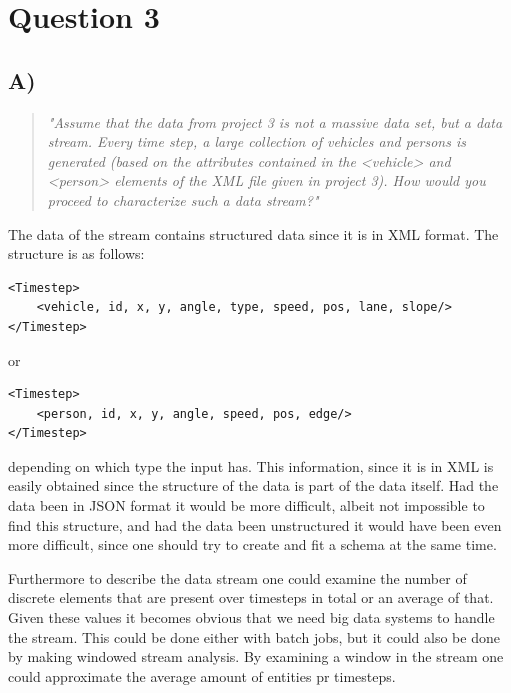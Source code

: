 \section{Question 3}

\subsection{A)}
\begin{quote}
	\textit{"Assume	that	the	data	from	project	3	is	not	a	massive	data	set,	but	a	data	stream.	Every	time	step,	a	large	collection	of	vehicles	and	persons	is	generated	(based	on	the	attributes	contained	in	the	<vehicle>	and	<person>	elements	of	the	XML	file	given	in	project	3).	How	would	you	proceed	to	characterize	such	a	data	stream?"}
\end{quote}
The data of the stream contains structured data since it is in XML format. The structure is as follows:
\begin{verbatim}
<Timestep>
    <vehicle, id, x, y, angle, type, speed, pos, lane, slope/>
</Timestep>
\end{verbatim}
or 
\begin{verbatim}
<Timestep>
    <person, id, x, y, angle, speed, pos, edge/>
</Timestep>
\end{verbatim}
depending on which type the input has. This information, since it is in XML is easily obtained since the structure of the data is part of the data itself. Had the data been in JSON format it would be more difficult, albeit not impossible to find this structure, and had the data been unstructured it would have been even more difficult, since one should try to create and fit a schema at the same time.

Furthermore to describe the data stream one could examine the number of discrete elements that are present over timesteps in total or an average of that. Given these values it becomes obvious that we need big data systems to handle the stream. This could be done either with batch jobs, but it could also be done by making windowed stream analysis. By examining a window in the stream one could approximate the average amount of entities pr timesteps. 

